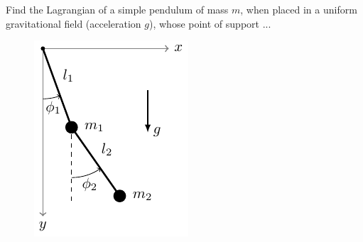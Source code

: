 
\begin{problem} 
{
Find the Lagrangian of a simple pendulum of mass $m$, when placed in a uniform gravitational field (acceleration $g$), whose point of support ...
\begin{figure}[H]
    \centering
    \includegraphics[page=3]{Figures/tikzpics.pdf}
\end{figure}
}{}{}
\end{problem}
